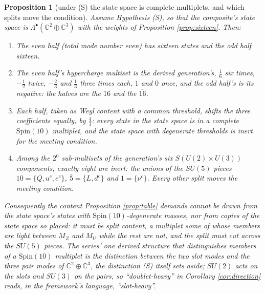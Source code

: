 \documentclass[11pt]{article}
\newtheorem{proposition}[theorem]{Proposition}
\theoremstyle{definition}
\newcommand{\C}{\mathbb{C}}
\begin{document}
\begin{proposition}[under (S) the state space is complete multiplets, and which splits move the condition]\label{prop:ledger}
Assume Hypothesis (S), so that the composite's state space is $\Lambda^{\bullet}(\C^{2} \oplus \C^{3})$ with the weights of Proposition \ref{prop:sixteen}. Then:
\begin{enumerate}
\item[(1)] The even half (total mode number even) has sixteen states and the odd half sixteen.
\item[(2)] The even half's hypercharge multiset is the derived generation's, $\tfrac16$ six times, $-\tfrac12$ twice, $-\tfrac23$ and $\tfrac13$ three times each, $1$ and $0$ once, and the odd half's is its negative: the halves are the $16$ and the $\overline{16}$.
\item[(3)] Each half, taken as Weyl content with a common threshold, shifts the three coefficients equally, by $\tfrac43$: every state in the state space is in a complete $\mathrm{Spin}(10)$ multiplet, and the state space with degenerate thresholds is inert for the meeting condition.
\item[(4)] Among the $2^{6}$ sub-multisets of the generation's six $S(U(2) \times U(3))$ components, exactly eight are inert: the unions of the $SU(5)$ pieces $10 = \{Q, u^{c}, e^{c}\}$, $\bar{5} = \{L, d^{c}\}$ and $1 = \{\nu^{c}\}$. Every other split moves the meeting condition.
\end{enumerate}
Consequently the content Proposition \ref{prop:table} demands cannot be drawn from the state space's states with $\mathrm{Spin}(10)$-degenerate masses, nor from copies of the state space so placed: it must be split content, a multiplet some of whose members are light between $M_{Z}$ and $M_{U}$ while the rest are not, and the split must cut across the $SU(5)$ pieces. The series' one derived structure that distinguishes members of a $\mathrm{Spin}(10)$ multiplet is the distinction between the two slot modes and the three pair modes of $\C^{2} \oplus \C^{3}$, the distinction (S) itself sets aside; $SU(2)$ acts on the slots and $SU(3)$ on the pairs, so ``doublet-heavy'' in Corollary \ref{cor:direction} reads, in the framework's language, ``slot-heavy''.
\end{proposition}
\end{document}
